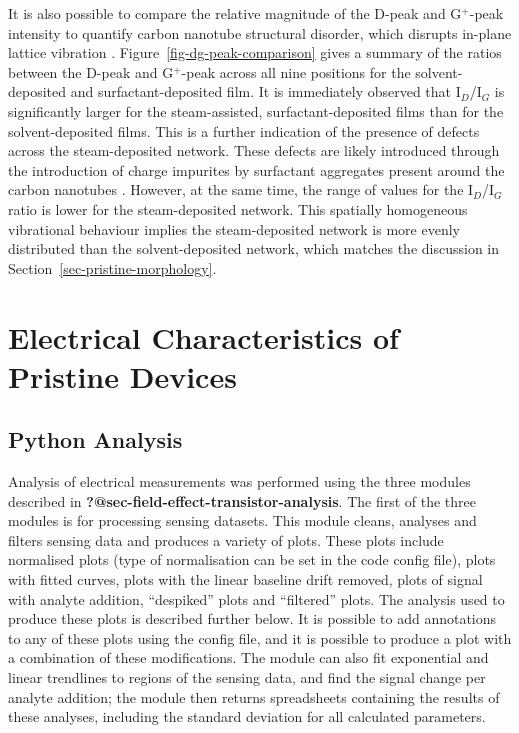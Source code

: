 \documentclass[
  a4paper,
]{scrbook}
\begin{document}
It is also possible to compare the relative magnitude of the D-peak and
G\(^+\)-peak intensity to quantify carbon nanotube structural disorder,
which disrupts in-plane lattice vibration
\autocite{Dresselhaus2005,King2014}. Figure~\ref{fig-dg-peak-comparison}
gives a summary of the ratios between the D-peak and G\(^+\)-peak across
all nine positions for the solvent-deposited and surfactant-deposited
film. It is immediately observed that I\(_{D}\)/I\(_{G}\) is
significantly larger for the steam-assisted, surfactant-deposited films
than for the solvent-deposited films. This is a further indication of
the presence of defects across the steam-deposited network. These
defects are likely introduced through the introduction of charge
impurites by surfactant aggregates present around the carbon nanotubes
\autocite{Christensen2022}. However, at the same time, the range of
values for the I\(_{D}\)/I\(_{G}\) ratio is lower for the
steam-deposited network. This spatially homogeneous vibrational
behaviour implies the steam-deposited network is more evenly distributed
than the solvent-deposited network, which matches the discussion in
Section~\ref{sec-pristine-morphology}.

\hypertarget{sec-pristine-electrical-characterisation}{%
\section{Electrical Characteristics of Pristine
Devices}\label{sec-pristine-electrical-characterisation}}

\hypertarget{sec-python-analysis}{%
\subsection{Python Analysis}\label{sec-python-analysis}}

Analysis of electrical measurements was performed using the three
modules described in \textbf{?@sec-field-effect-transistor-analysis}.
The first of the three modules is for processing sensing datasets. This
module cleans, analyses and filters sensing data and produces a variety
of plots. These plots include normalised plots (type of normalisation
can be set in the code config file), plots with fitted curves, plots
with the linear baseline drift removed, plots of signal with analyte
addition, ``despiked'' plots and ``filtered'' plots. The analysis used
to produce these plots is described further below. It is possible to add
annotations to any of these plots using the config file, and it is
possible to produce a plot with a combination of these modifications.
The module can also fit exponential and linear trendlines to regions of
the sensing data, and find the signal change per analyte addition; the
module then returns spreadsheets containing the results of these
analyses, including the standard deviation for all calculated
parameters.
\end{document}
